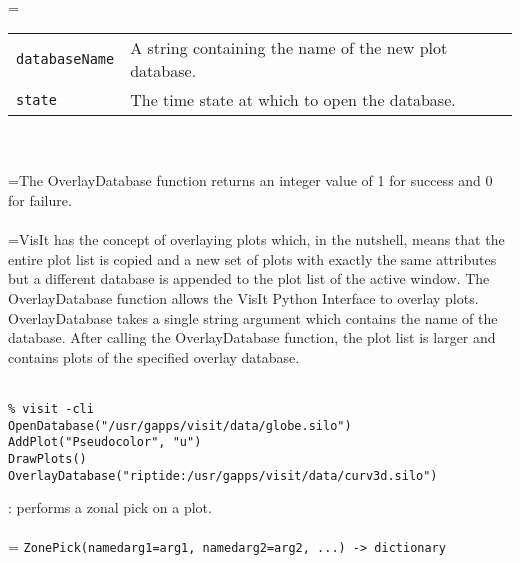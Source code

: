 \documentclass[10pt,a4paper]{report}
\begin{document}
 \\ 
\hangindent=\parindent 
\begin{tabular}{lp{9cm}}
\verb!databaseName! & A string containing the name of the new plot database. \\
\verb!state! & The time state at which to open the database. \\
\end{tabular} \\[-2mm]


 \\ 
\hangindent=\parindent The OverlayDatabase function returns an integer value of 1 for success and 0 for failure. \\[-3mm] 

 \\ 
\hangindent=\parindent VisIt has the concept of overlaying plots which, in the nutshell, means that the entire plot list is copied and a new set of plots with exactly the same attributes but a different database is appended to the plot list of the active window. The OverlayDatabase function allows the VisIt Python Interface to overlay plots. OverlayDatabase takes a single string argument which contains the name of the database. After calling the OverlayDatabase function, the plot list is larger and contains plots of the specified overlay database. \\[-3mm] 

\\[-6mm]
\begin{verbatim}% visit -cli
OpenDatabase("/usr/gapps/visit/data/globe.silo")
AddPlot("Pseudocolor", "u")
DrawPlots()
OverlayDatabase("riptide:/usr/gapps/visit/data/curv3d.silo")
\end{verbatim}
\newpage


{}
: performs a zonal pick on a plot.\\[-3mm]

 \\ 
\hangindent=\parindent 
\verb!ZonePick(namedarg1=arg1, namedarg2=arg2, ...) -> dictionary!\\ [-3mm]
\end{document}
